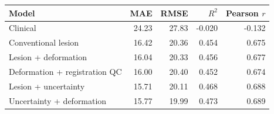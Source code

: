 \begin{tabular}{lrrrr}
\toprule
Model & MAE & RMSE & $R^2$ & Pearson $r$ \\
\midrule
Clinical & 24.23 & 27.83 & -0.020 & -0.132 \\
Conventional lesion & 16.42 & 20.36 & 0.454 & 0.675 \\
Lesion + deformation & 16.04 & 20.33 & 0.456 & 0.677 \\
Deformation + registration QC & 16.00 & 20.40 & 0.452 & 0.674 \\
Lesion + uncertainty & 15.71 & 20.11 & 0.468 & 0.688 \\
Uncertainty + deformation & 15.77 & 19.99 & 0.473 & 0.689 \\
\bottomrule
\end{tabular}
